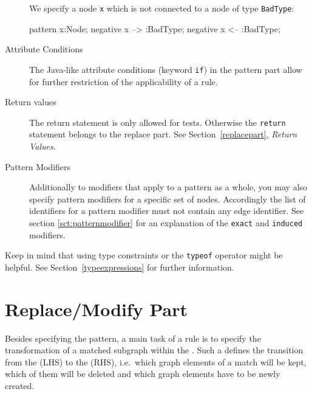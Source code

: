\begin{description}
\begin{example}
    We specify a node \texttt{x} which is not connected to a node of type \texttt{BadType}:
    \begin{grgen}
pattern {
  x:Node;
  negative {
    x --> :BadType;
  }
  negative {  
    x <-- :BadType;
  }
}
    \end{grgen}
  \end{example}
  \item[Attribute Conditions] The Java-like attribute conditions (keyword \texttt{if}) in the pattern part allow for further restriction of the applicability of a rule.
  \item[Return values] The return statement is only allowed for tests. Otherwise the \texttt{return} statement belongs to the replace part. See Section~\ref{replacepart}, \emph{Return Values}.
  \item[Pattern Modifiers] Additionally to modifiers that apply to a pattern as a whole, you may also specify pattern modifiers for a specific set of nodes. Accordingly the list of identifiers for a pattern modifier must not contain any edge identifier. See section \ref{sct:patternmodifier} for an explanation of the \texttt{exact} and \texttt{induced} modifiers. 
\end{description}
Keep in mind that using type constraints or the \texttt{typeof} operator might be helpful. See Section~\ref{typeexpressions} for further information.

\section{Replace/Modify Part}
\label{replacepart}
Besides specifying the pattern, a main task of a rule is to specify the transformation of a matched subgraph within the . 
Such a  defines the transition from the  (LHS) to the  (RHS), i.e.\ which graph elements of a match will be kept, which of them will be deleted and which graph elements have to be newly created.

